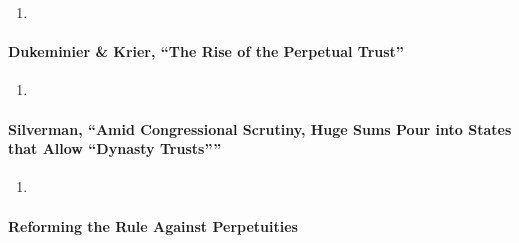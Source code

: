 \begin{enumerate}
    \item %
\end{enumerate}

\paragraph{Dukeminier \& Krier, ``The Rise of the Perpetual Trust''}

\begin{enumerate}
    \item %
\end{enumerate}

\paragraph{Silverman, ``Amid Congressional Scrutiny, Huge Sums Pour into 
States that Allow \enquote{Dynasty Trusts}''}

\begin{enumerate}
    \item %
\end{enumerate}

\paragraph{Reforming the Rule Against Perpetuities}

